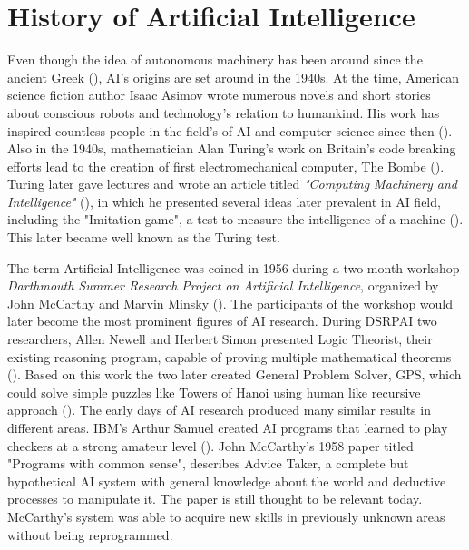 \documentclass[utf8,english]{gradu3}
\begin{document}
\section{History of Artificial Intelligence}
\label{history}

Even though the idea of autonomous machinery has been around since the ancient
Greek (\cite{bramer2009artificial}), AI's origins are set around in the 1940s. At the time,
American science fiction author Isaac Asimov wrote numerous novels and
short stories about conscious robots and technology's relation to humankind.
His work has inspired countless people in the field's of AI and computer science
since then (\cite{kaplan2019}).
Also in the 1940s, mathematician Alan Turing's work on Britain's
code breaking efforts lead to the creation of first electromechanical computer,
The Bombe (\cite{kaplan2019}). Turing later gave lectures and wrote an article
titled \emph{"Computing Machinery and Intelligence"} (\cite*{turing1950}),
in which he presented several ideas later prevalent in AI field, including the
"Imitation game", a test to measure the intelligence of a machine
(\cite{norvig2002}). This later became well known as the Turing test.

The term Artificial Intelligence was coined in 1956 during a two-month workshop
\emph{Darthmouth Summer Research Project on Artificial Intelligence}, organized
by John McCarthy and Marvin Minsky (\cite{kaplan2019}). The participants of the
workshop would later become the most prominent figures of AI research. During
DSRPAI two researchers, Allen Newell and Herbert Simon presented Logic Theorist,
their existing reasoning program, capable of proving multiple mathematical
theorems (\cite{norvig2002}). Based on this work the two later created General
Problem Solver, GPS, which could solve simple puzzles like Towers of Hanoi
using human like recursive approach (\cite{newell1959}). The early days of AI
research produced many similar results in different areas. IBM's Arthur Samuel
created AI programs that learned to play checkers at a strong amateur level
(\cite{norvig2002}).
John McCarthy's 1958 paper titled "Programs with common sense", describes Advice
Taker, a complete but hypothetical AI system with general knowledge about the
world and deductive processes to manipulate it. The paper is still thought to be
relevant today. McCarthy's system was able to acquire new skills in previously
unknown areas without being reprogrammed.
\end{document}
